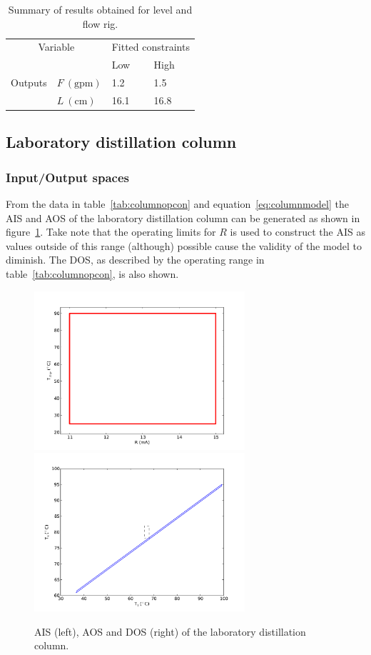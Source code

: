 \begin{table}[htbp]
  \centering
  \begin{tabular}{llll}
    \toprule
    \multicolumn{2}{c}{Variable} & \multicolumn{2}{c}{Fitted constraints}\\
    && Low & High\\ 
    \midrule
    Outputs &$F~(\text{gpm})$ & 1.2 & 1.5 \\
            &$L~(\text{cm})$  & 16.1 & 16.8 \\
    \bottomrule
  \end{tabular}
  \caption{Summary of results obtained for level and flow rig.}
  \label{tab:flowsummary}
\end{table}


\subsection{Laboratory distillation column}
\subsubsection{Input/Output spaces}
From the data in table~\ref{tab:columnopcon} and equation~\ref{eq:columnmodel} the AIS and AOS of the laboratory distillation column can be generated as shown in figure~\ref{fig:columnaisaos}.
Take note that the operating limits for $R$ is used to construct the AIS as values outside of this range (although) possible cause the validity of the model to diminish.
The DOS, as described by the operating range in table~\ref{tab:columnopcon}, is also shown.

\begin{figure}[htbp]
  \centering
    \includegraphics[width=7.8cm]{graph/columnais.pdf}
    \includegraphics[width=7.8cm]{graph/columnaos.pdf}
  \caption[AIS, AOS and DOS of the laboratory distillation column]{AIS (left), AOS and DOS (right) of the laboratory distillation column.}
  \label{fig:columnaisaos}
\end{figure}

